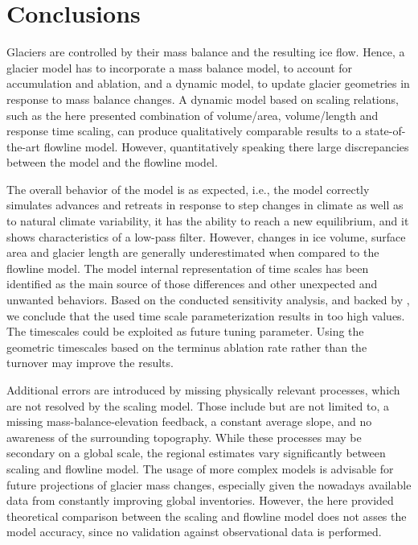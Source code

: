 \chapter{Conclusions}\label{chap:conclusions}
\thispagestyle{plain}


Glaciers are controlled by their mass balance and the resulting ice flow. Hence, a glacier model has to incorporate a mass balance model, to account for accumulation and ablation, and a dynamic model, to update glacier geometries in response to mass balance changes. A dynamic model based on scaling relations, such as the here presented combination of volume/area, volume/length and response time scaling, can produce qualitatively comparable results to a state-of-the-art flowline model. However, quantitatively speaking there large discrepancies between the \vas{} model and the flowline model.

The overall behavior of the \vas{} model is as expected, i.e., the model correctly simulates advances and retreats in response to step changes in climate as well as to natural climate variability, it has the ability to reach a new equilibrium, and it shows characteristics of a low-pass filter. However, changes in ice volume, surface area and glacier length are generally underestimated when compared to the flowline model. The model internal representation of time scales has been identified as the main source of those differences and other unexpected and unwanted behaviors. Based on the conducted sensitivity analysis, and backed by \citet{Roe2020}, we conclude that the used time scale parameterization results in too high values. The timescales could be exploited as future tuning parameter. Using the geometric timescales based on the terminus ablation rate \citep{Johannesson1989} rather than the turnover may improve the results.

Additional errors are introduced by missing physically relevant processes, which are not resolved by the scaling model. Those include but are not limited to, a missing mass-balance-elevation feedback, a constant average slope, and no awareness of the surrounding topography. While these processes may be secondary on a global scale, the regional estimates vary significantly between scaling and flowline model. The usage of more complex models is advisable for future projections of glacier mass changes, especially given the nowadays available data from constantly improving global inventories. However, the here provided theoretical comparison between the scaling and flowline model does not asses the model accuracy, since no validation against observational data is performed.

